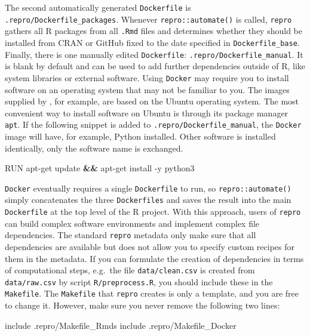 \documentclass[psych,tutorial,submit,moreauthors,pdftex]{mdpi}
\newenvironment{Shaded}{\begin{snugshade}}{\end{snugshade}}
\newcommand{\AttributeTok}[1]{\textcolor[rgb]{0.77,0.63,0.00}{#1}}
\newcommand{\ExtensionTok}[1]{#1}
\newcommand{\KeywordTok}[1]{\textcolor[rgb]{0.13,0.29,0.53}{\textbf{#1}}}
\newcommand{\NormalTok}[1]{#1}
\begin{document}
The second automatically generated \texttt{Dockerfile} is
\texttt{.repro/Dockerfile\_packages}. Whenever
\texttt{repro::automate()} is called, \texttt{repro} gathers all R
packages from all \texttt{.Rmd} files and determines whether they should
be installed from CRAN or GitHub fixed to the date specified in
\texttt{Dockerfile\_base}. Finally, there is one manually edited
\texttt{Dockerfile}: \texttt{.repro/Dockerfile\_manual}. It is blank by
default and can be used to add further dependencies outside of R, like
system libraries or external software. Using \texttt{Docker} may require
you to install software on an operating system that may not be familiar
to you. The images supplied by
\citep{boettigerIntroductionRockerDocker2017}, for example, are based on
the Ubuntu operating system. The most convenient way to install software
on Ubuntu is through its package manager \texttt{apt}. If the following
snippet is added to \texttt{.repro/Dockerfile\_manual}, the
\texttt{Docker} image will have, for example, Python installed. Other
software is installed identically, only the software name is exchanged.

\begin{Shaded}
\begin{Highlighting}[]
\ExtensionTok{RUN}\NormalTok{ apt{-}get update }\KeywordTok{\&\&} \ExtensionTok{apt{-}get}\NormalTok{ install }\AttributeTok{{-}y}\NormalTok{ python3}
\end{Highlighting}
\end{Shaded}

\texttt{Docker} eventually requires a single \texttt{Dockerfile} to run,
so \texttt{repro::automate()} simply concatenates the three
\texttt{Dockerfiles} and saves the result into the main
\texttt{Dockerfile} at the top level of the R project. With this
approach, users of \texttt{repro} can build complex software
environments and implement complex file dependencies. The standard
\texttt{repro} metadata only make sure that all dependencies are
available but does not allow you to specify custom recipes for them in
the metadata. If you can formulate the creation of dependencies in terms
of computational steps, e.g.~the file \texttt{data/clean.csv} is created
from \texttt{data/raw.csv} by script \texttt{R/preprocess.R}, you should
include these in the \texttt{Makefile}. The \texttt{Makefile} that
\texttt{repro} creates is only a template, and you are free to change
it. However, make sure you never remove the following two lines:

\begin{Shaded}
\begin{Highlighting}[]
\ExtensionTok{include}\NormalTok{ .repro/Makefile\_Rmds}
\ExtensionTok{include}\NormalTok{ .repro/Makefile\_Docker}
\end{Highlighting}
\end{Shaded}
\end{document}
